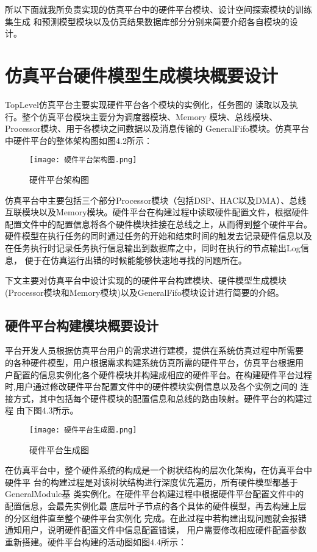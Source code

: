 所以下面就我所负责实现的仿真平台中的硬件平台模块、设计空间探索模块的训练集生成
和预测模型模块以及仿真结果数据库部分分别来简要介绍各自模块的设计。

\section{仿真平台硬件模型生成模块概要设计}
TopLevel仿真平台主要实现硬件平台各个模块的实例化，任务图的
读取以及执行。整个仿真平台模块主要分为调度器模块、Memory
模块、总线模块、Processor模块、用于各模块之间数据以及消息传输的
GeneralFifo模块。仿真平台中硬件平台的整体架构图如图4.2所示：

\begin{figure}[h]
    \centering
    \texttt{[image: 硬件平台架构图.png]}
    \caption{硬件平台架构图}
    \label{fig:badge}
\end{figure}

仿真平台中主要包括三个部分Processor模块（包括DSP、HAC以及DMA）、总线
互联模块以及Memory模块。硬件平台在构建过程中读取硬件配置文件，根据硬件
配置文件中的配置信息将各个硬件模块挂接在总线之上，从而得到整个硬件平台。
硬件模型在执行任务的同时通过任务的开始和结束时间的触发去记录硬件信息以及
在任务执行时记录任务执行信息输出到数据库之中，同时在执行的节点输出Log信息，
便于在仿真运行出错的时候能能够快速地寻找的问题所在。

下文主要对仿真平台中设计实现的的硬件平台构建模块、硬件模型生成模块
(Processor模块和Memory模块)以及GeneralFifo模块设计进行简要的介绍。

\subsection{硬件平台构建模块概要设计}
平台开发人员根据仿真平台用户的需求进行建模，提供在系统仿真过程中所需要
的各种硬件模型，用户根据需求构建系统仿真所需的硬件平台，仿真平台根据用
户配置的信息实例化各个硬件模块并构建成相应的硬件平台。在构建硬件平台过程
时,用户通过修改硬件平台配置文件中的硬件模块实例信息以及各个实例之间的
连接方式，其中包括每个硬件模块的配置信息和总线的路由映射。硬件平台的构建过程
由下图4.3所示。

\begin{figure}[h]
    \centering
    \texttt{[image: 硬件平台生成图.png]}
    \caption{硬件平台生成图}
    \label{fig:badge}
\end{figure}

在仿真平台中，整个硬件系统的构成是一个树状结构的层次化架构，在仿真平台中硬件平
台的构建过程是对该树状结构进行深度优先遍历，所有硬件模型都基于GeneralModule基
类实例化。在硬件平台构建过程中根据硬件平台配置文件中的配置信息，会最先实例化最
底层叶子节点的各个具体的硬件模型，再去构建上层的分区组件直至整个硬件平台实例化
完成。在此过程中若构建出现问题就会报错通知用户，说明硬件配置文件中信息配置错误，
用户需要修改相应硬件配置参数重新搭建。硬件平台构建的活动图如图4.4所示：

